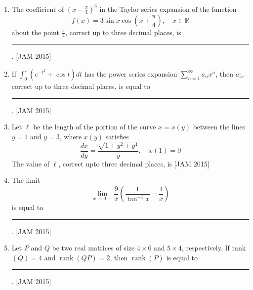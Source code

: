 \begin{enumerate}
\item  

The coefficient of $\left(x-\frac{\pi}{4}\right)^{3}$ in the Taylor series expansion of the function
$$
f(x)=3 \sin x \cos \left(x+\frac{\pi}{4}\right), \quad x \in \mathbb{R}
$$
about the point $\frac{\pi}{4}$, correct up to three decimal places, is \rule{3cm}{1pt}.
\hfill [JAM 2015]



\item  

If $\int_{0}^{x}\left(e^{-t^{2}}+\cos t\right) d t$ has the power series expansion $\sum_{n=1}^{\infty} a_{n} x^{n}$, then $a_{5}$, correct up to three decimal places, is equal to \rule{3cm}{1pt}.
\hfill [JAM 2015]



\item  

Let $\ell$ be the length of the portion of the curve $x=x(y)$ between the lines $y=1$ and $y=3$, where $x(y)$ satisfies
$$
\frac{d x}{d y}=\frac{\sqrt{1+y^{2}+y^{4}}}{y}, \quad x(1)=0
$$
The value of $\ell$, correct upto three decimal places, is
\hfill [JAM 2015]

\item 
The limit
$$
\lim _{x \rightarrow 0+} \frac{9}{x}\left(\frac{1}{\tan ^{-1} x}-\frac{1}{x}\right)
$$
is equal to \rule{3cm}{1pt}.
\hfill [JAM 2015]




\item  Let $P$ and $Q$ be two real matrices of size $4 \times 6$ and $5 \times 4$, respectively. If rank $(Q)=4$ and $\operatorname{rank}(Q P)=2$, then $\operatorname{rank}(P)$ is equal to \rule{3cm}{1pt}.
\hfill [JAM 2015]



   
\end{enumerate}
\newpage
